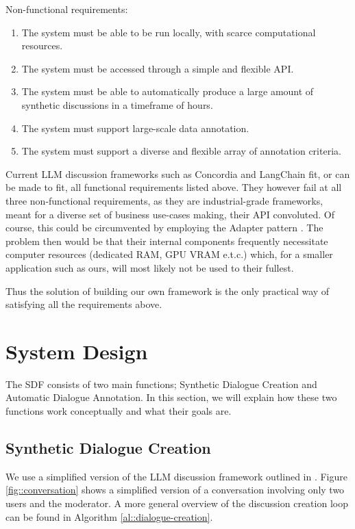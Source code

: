 Non-functional requirements:
\begin{enumerate}
	\item The system must be able to be run locally, with scarce computational resources.
	\item The system must be accessed through a simple and flexible \ac{API}.
	\item The system must be able to automatically produce a large amount of synthetic discussions in a timeframe of hours.
	\item The system must support large-scale data annotation.
	\item The system must support a diverse and flexible array of annotation criteria.
\end{enumerate}

Current LLM discussion frameworks such as Concordia \cite{Vezhnevets2023GenerativeAM} and LangChain \cite{langchain} fit, or can be made to fit, all functional requirements listed above. They however fail at all three non-functional requirements, as they are industrial-grade frameworks, meant for a diverse set of business use-cases making, their \ac{API} convoluted. Of course, this could be circumvented by employing the Adapter pattern \cite{gamma1995design}. The problem then would be that their internal components frequently necessitate computer resources (dedicated RAM, GPU VRAM e.t.c.) which, for a smaller application such as ours, will most likely not be used to their fullest.

Thus the solution of building our own framework is the only practical way of satisfying all the requirements above.



\section{System Design}
\label{sec:system:design-system}

The \ac{SDF} consists of two main functions; Synthetic Dialogue Creation and Automatic Dialogue Annotation. In this section, we will explain how these two functions work conceptually and what their goals are.


\subsection{Synthetic Dialogue Creation}
\label{ssec:system:creation}

We use a simplified version of the LLM discussion framework outlined in \cite{abdelnabi2024cooperationcompetitionmaliciousnessllmstakeholders}. Figure \ref{fig::conversation} shows a simplified version of a conversation involving only two users and the moderator. A more general overview of the discussion creation loop can be found in Algorithm \ref{al::dialogue-creation}.

